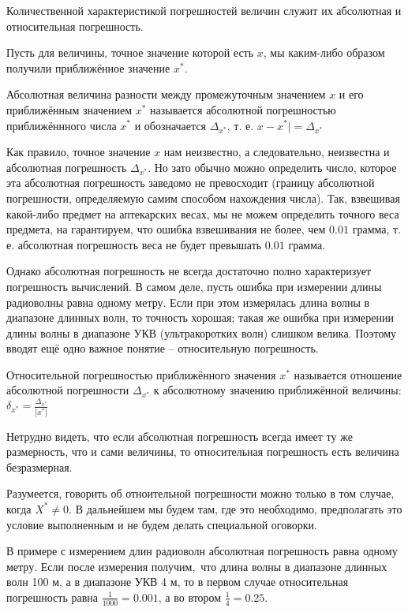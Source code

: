 Количественной характеристикой погрешностей величин служит их абсолютная и
относительная погрешность.

Пусть для величины, точное значение которой есть $x$, мы каким-либо образом
получили приближённое значение $x^*$.

\begin{definition}
	Абсолютная величина разности между промежуточным значением $x$ и его
	приближённым значением $x^*$ называется абсолютной погрешностью
	приближённного числа $x^*$ и обозначается $\Delta_{x^*}$, т. е. $x - x^*| =
	\Delta_{x^*}$
\end{definition}

Как правило, точное значение $x$ нам неизвестно, а следовательно, неизвестна и
абсолютная погрешность $\Delta_{x^*}$. Но зато обычно можно определить число,
которое эта абсолютная погрешность заведомо не превосходит (границу абсолютной
погрешности, определяемую самим способом нахождения числа). Так, взвешивая
какой-либо предмет на аптекарских весах, мы не можем определить точного веса
предмета, на гарантируем, что ошибка взвешивания не более, чем $0.01$ грамма,
т. е. абсолютная погрешность веса не будет превышать $0.01$ грамма.

Однако абсолютная погрешность не всегда достаточно полно характеризует
погрешность вычислений. В самом деле, пусть ошибка при измерении длины
радиоволны равна одному метру. Если при этом измерялась длина волны в диапазоне
длинных волн, то точность хорошая; такая же ошибка при измерении длины волны в
диапазоне УКВ (ультракоротких волн) слишком велика. Поэтому вводят ещё одно
важное понятие -- относительную погрешность.

\begin{definition}
	Относительной погрешностью приближённого значения $x^*$ называется
	отношение абсолютной погрешности $\Delta_{x^*}$ к абсолютному значению
	приближённой величины: $\delta_{x^*} = \frac{\Delta_{x^*}}{|x^*|}$
\end{definition}

Нетрудно видеть, что если абсолютная погрешность всегда имеет ту же
размерность, что и сами величины, то относительная погрешность есть величина
безразмерная.

Разумеется, говорить об отноительной погрешности можно только в том случае,
когда $X^* \neq 0$. В дальнейшем мы будем там, где это необходимо, предполагать
это условие выполненным и не будем делать специальной оговорки.

В примере с измерением длин радиоволн абсолютная погрешность равна одному
метру. Если после измерения получим, что длина волны в диапазоне длинных волн
100 м, а в диапазоне УКВ 4 м, то в первом случае относительная погрешность
равна $\frac{1}{1000} = 0.001$, а во втором $\frac{1}{4} = 0.25$.

